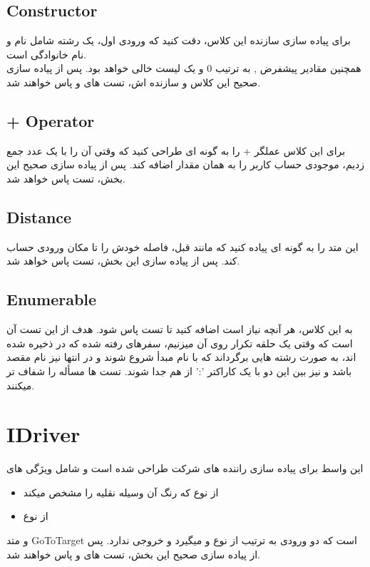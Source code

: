     \subsection{Constructor}
    برای پیاده سازی سازنده این کلاس، دقت کنید که ورودی اول،
    یک رشته شامل نام و نام خانوادگی است.
    \\
    همچنین مقادیر
    پیشفرض  , 
    به ترتیب 0 و یک لیست خالی خواهد بود.
    پس از پیاده سازی صحیح این کلاس و سازنده اش، تست های 
    \grayBox{\textcolor{dkgreen}{CustomerInheritedInterfacesTest}}
    و
    \grayBox{\textcolor{dkgreen}{CustomerConstructorTest}}
    پاس خواهند شد.
    
    \subsection{+ Operator}
    برای این کلاس عملگر + را به گونه ای طراحی کنید که وقتی آن را با یک عدد جمع زدیم، موجودی حساب کاربر را به همان مقدار اضافه کند.
    پس از پیاده سازی صحیح این بخش، 
    تست
    \grayBox{\textcolor{dkgreen}{CustomerChargeAccountTest}}
    پاس خواهد شد.
    
    \subsection{Distance}
    این متد را به گونه ای پیاده کنید که
    مانند قبل، فاصله خودش را تا مکان ورودی حساب کند.
    پس از پیاده سازی این بخش، تست 
    \grayBox{\textcolor{dkgreen}{CustomerDistanceTest}}
    پاس خواهد شد.
    
    \subsection{Enumerable}
    به این کلاس، هر آنچه نیاز است اضافه کنید تا تست 
    \grayBox{\textcolor{dkgreen}{CustomerIEnumerableTest}}
    پاس شود.
    هدف از این تست آن است که وقتی یک حلقه تکرار روی آن میزنیم، سفرهای رفته شده که در  ذخیره شده اند، به صورت رشته هایی برگرداند که با نام مبدأ شروع شوند و در انتها نیز نام مقصد باشد و نیز بین این دو با یک کاراکتر  ':' از هم جدا شوند.
    تست ها مسأله را شفاف تر میکنند.
    
\section{IDriver}
این واسط برای پیاده سازی راننده های شرکت طراحی شده است و شامل ویژگی های 
    \begin{itemize}
        \item {} از نوع 
            \grayBox{\textcolor{blue}{Color}}
            که رنگ آن وسیله نقلیه را مشخص میکند
        \item {} از نوع 
            \grayBox{\textcolor{blue}{List<Traffic>}}
    \end{itemize}
    و متد 
    GoToTarget
    است که دو ورودی به ترتیب از نوع 
    \grayBox{\textcolor{blue}{Customer}}
    و
    \grayBox{\textcolor{blue}{ILocatable}}
    میگیرد و خروجی ندارد.
    پس از پیاده سازی صحیح این بخش،
    تست های 
    \grayBox{\textcolor{dkgreen}{IDriverPropertyTest}}
    و
    \grayBox{\textcolor{dkgreen}{IDriverMethodTest}}
    پاس خواهند شد.
    
